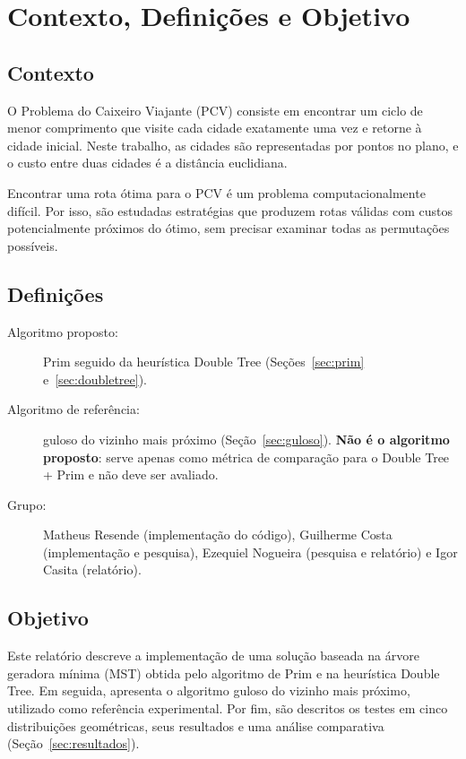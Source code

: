 \documentclass[11pt,a4paper]{article}
\renewcommand{\_}{\underscoreoriginal\allowbreak}
\begin{document}
\setcounter{section}{-1}
\section{Contexto, Definições e Objetivo}

\subsection{Contexto}

O Problema do Caixeiro Viajante (PCV) consiste em encontrar um ciclo de
menor comprimento que visite cada cidade exatamente uma vez e retorne à
cidade inicial. Neste trabalho, as cidades são representadas por pontos
no plano, e o custo entre duas cidades é a distância euclidiana.

Encontrar uma rota ótima para o PCV é um problema computacionalmente
difícil. Por isso, são estudadas estratégias que produzem rotas válidas
com custos potencialmente próximos do ótimo, sem precisar examinar todas
as permutações possíveis.

\subsection{Definições}

\begin{description}
  \item[Algoritmo proposto:] Prim seguido da heurística Double Tree
    (Seções~\ref{sec:prim} e~\ref{sec:doubletree}).
  \item[Algoritmo de referência:] guloso do vizinho mais próximo
    (Seção~\ref{sec:guloso}). \textbf{Não é o algoritmo proposto}: serve
    apenas como métrica de comparação para o Double Tree + Prim e não
    deve ser avaliado.
  \item[Grupo:] Matheus Resende (implementação do código), Guilherme
    Costa (implementação e pesquisa), Ezequiel Nogueira (pesquisa e
    relatório) e Igor Casita (relatório).
\end{description}

\subsection{Objetivo}

Este relatório descreve a implementação de uma solução baseada na árvore
geradora mínima (MST) obtida pelo algoritmo de Prim e na heurística
Double Tree. Em seguida, apresenta o algoritmo guloso do vizinho mais
próximo, utilizado como referência experimental. Por fim, são descritos
os testes em cinco distribuições geométricas, seus resultados e uma
análise comparativa (Seção~\ref{sec:resultados}).
\end{document}
